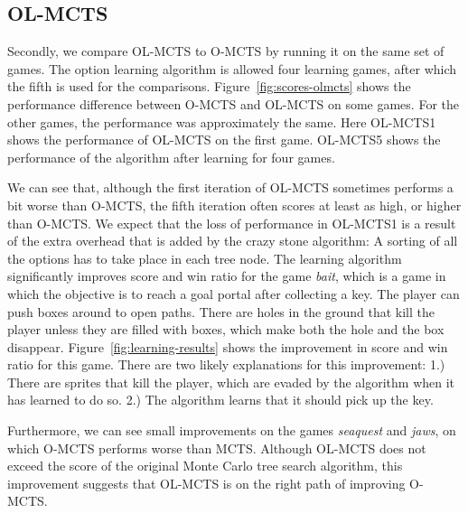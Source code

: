 \subsection{OL-MCTS}
\label{subsec:olmcts}
Secondly, we compare OL-MCTS to O-MCTS by running it on the same set of games.
The option learning algorithm is allowed four learning games, after which the
fifth is used for the comparisons. Figure~\ref{fig:scores-olmcts} shows the
performance difference between O-MCTS and OL-MCTS on some games. For the other
games, the performance was approximately the same. Here OL-MCTS1 shows the
performance of OL-MCTS on the first game. OL-MCTS5 shows the performance of the
algorithm after learning for four games. 

We can see that, although the first iteration of OL-MCTS sometimes performs a
bit worse than O-MCTS, the fifth iteration often scores at least as high, or
higher than O-MCTS\@. We expect that the loss of performance in OL-MCTS1 is
a result of the extra overhead that is added by the crazy stone algorithm: A
sorting of all the options has to take place in each tree node. The learning
algorithm significantly improves score and win ratio for the game \textit{bait},
which is a game in which the objective is to reach a goal portal after
collecting a key.  The player can push boxes around to open paths. There are
holes in the ground that kill the player unless they are filled with boxes,
which make both the hole and the box disappear. 
Figure~\ref{fig:learning-results} shows the improvement in score and win ratio
for this game. There are two likely explanations for this improvement: 1.) There
are sprites that kill the player, which are evaded by the algorithm when it has
learned to do so.  2.) The algorithm learns that it should pick up the key.

Furthermore, we can see small improvements on the games \textit{seaquest} and
\textit{jaws}, on which O-MCTS performs worse than MCTS\@.  Although OL-MCTS does
not exceed the score of the original Monte Carlo tree search algorithm, this
improvement suggests that OL-MCTS is on the right path of improving O-MCTS\@.

